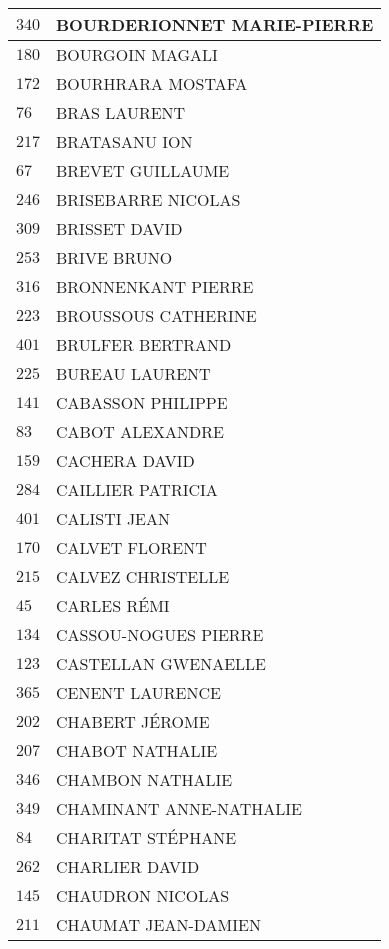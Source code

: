 \begin{xltabular}{\linewidth}{|l|X|}
    \hline
    $340$ & BOURDERIONNET MARIE-PIERRE \\
    \hline
    $180$ & BOURGOIN MAGALI \\
    \hline
    $172$ & BOURHRARA MOSTAFA \\
    \hline
    $76$ & BRAS LAURENT \\
    \hline
    $217$ & BRATASANU ION \\
    \hline
    $67$ & BREVET GUILLAUME \\
    \hline
    $246$ & BRISEBARRE NICOLAS \\
    \hline
    $309$ & BRISSET DAVID \\
    \hline
    $253$ & BRIVE BRUNO \\
    \hline
    $316$ & BRONNENKANT PIERRE \\
    \hline
    $223$ & BROUSSOUS CATHERINE \\
    \hline
    $401$ & BRULFER BERTRAND \\
    \hline
    $225$ & BUREAU LAURENT \\
    \hline
    $141$ & CABASSON PHILIPPE \\
    \hline
    $83$ & CABOT ALEXANDRE \\
    \hline
    $159$ & CACHERA DAVID \\
    \hline
    $284$ & CAILLIER PATRICIA \\
    \hline
    $401$ & CALISTI JEAN \\
    \hline
    $170$ & CALVET FLORENT \\
    \hline
    $215$ & CALVEZ CHRISTELLE \\
    \hline
    $45$ & CARLES RÉMI \\
    \hline
    $134$ & CASSOU-NOGUES PIERRE \\
    \hline
    $123$ & CASTELLAN GWENAELLE \\
    \hline
    $365$ & CENENT LAURENCE \\
    \hline
    $202$ & CHABERT JÉROME \\
    \hline
    $207$ & CHABOT NATHALIE \\
    \hline
    $346$ & CHAMBON NATHALIE \\
    \hline
    $349$ & CHAMINANT ANNE-NATHALIE \\
    \hline
    $84$ & CHARITAT STÉPHANE \\
    \hline
    $262$ & CHARLIER DAVID \\
    \hline
    $145$ & CHAUDRON NICOLAS \\
    \hline
    $211$ & CHAUMAT JEAN-DAMIEN \\

\end{xltabular}

